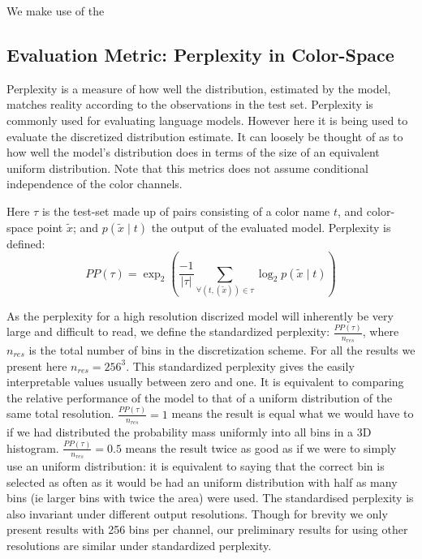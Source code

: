 \documentclass[11pt,a4paper]{article}
\newcommand{\textcite}{\citet}
\begin{document}
We make use of the \textcite{silverman1982algorithm}


\subsection{Evaluation Metric: Perplexity in Color-Space}
Perplexity is a measure of how well the distribution, estimated by the model, matches reality according to the observations in the test set.
Perplexity is commonly used for evaluating language models. However here it is being used to evaluate the discretized distribution estimate.
It can loosely be thought of as to how well the model's distribution does in terms of the size of an equivalent uniform distribution.
Note that this metrics does not assume conditional independence of the color channels.

Here $\tau$ is the test-set made up of pairs consisting of a color name $t$, and color-space point $\tilde{x}$;
and  $p(\tilde{x}\mid t)$  the output of the evaluated model.
Perplexity is defined:
\begin{equation}
PP(\tau) = \exp_2{\left(
	\frac{-1}{|\tau|} 
	\sum_{
		\forall(t,(\tilde{x})) \in \tau}
	\log_2 p(\tilde{x}\mid t)\right)}
\end{equation}

As the perplexity for a high resolution discrized model will inherently be very large and difficult to read,
we define the standardized perplexity: $\frac{PP(\tau)}{n_{res}}$,
where $n_{res}$ is the total number of bins in the discretization scheme.
For all the results we present here $n_{res} = 256^3$.
This standardized perplexity gives the easily interpretable values usually between zero and one.
It is equivalent to comparing the relative performance of the model to that of a uniform distribution of the same total resolution.
$\frac{PP(\tau)}{n_{res}}=1$ means the result is equal what we would have to if we had distributed the probability mass uniformly into all bins in a 3D histogram.
$\frac{PP(\tau)}{n_{res}}=0.5$ means the result twice as good as if we were to simply use an uniform distribution: it is equivalent to saying that the correct bin is selected as often as it would be had an uniform distribution with half as many bins (ie larger bins with twice the area) were used.
The standardised perplexity is also invariant under different output resolutions.
Though for brevity we only  present results with 256 bins per channel, our preliminary results for using other resolutions are similar under standardized perplexity.
\end{document}
